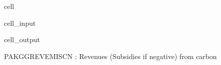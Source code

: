 \documentclass[letterpaper,10pt,english]{jupyterBook}
\begin{document}
\begin{sphinxuseclass}{cell}\begin{sphinxVerbatimInput}

\begin{sphinxuseclass}{cell_input}
\begin{sphinxVerbatim}[commandchars=\\\{\}]
\PYG{p}{[}\PYG{p}{]}
\end{sphinxVerbatim}

\end{sphinxuseclass}\end{sphinxVerbatimInput}
\begin{sphinxVerbatimOutput}

\begin{sphinxuseclass}{cell_output}
\begin{sphinxVerbatim}[commandchars=\\\{\}]
PAKGGREVEMISCN : Revenues (Subsidies if negative) from carbon
\end{sphinxVerbatim}

\end{sphinxuseclass}\end{sphinxVerbatimOutput}

\end{sphinxuseclass}
\end{document}
